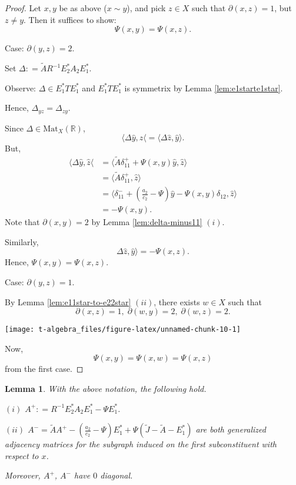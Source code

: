 \documentclass[
]{book}
\newtheorem{lemma}{Lemma}[chapter]
\theoremstyle{definition}
\theoremstyle{definition}
\theoremstyle{definition}
\theoremstyle{definition}
\theoremstyle{remark}
\begin{document}
\begin{proof}
Let \(x,y\) be as above (\(x\sim y\)), and pick \(z\in X\) such that \(\partial(x,z) = 1\), but \(z\neq y\). Then it suffices to show:
\[\Psi(x,y) = \Psi(x,z).\]

Case: \(\partial(y,z) = 2\).

Set \(\Delta: = \tilde{A}R^{-1}E^*_2A_2E^*_1\).

Observe: \(\Delta \in E^*_1TE^*_1\) and \(E^*_1TE^*_1\) is symmetrix by Lemma \ref{lem:e1starte1star}.

Hence, \(\Delta_{yz} = \Delta_{zy}\).

Since \(\Delta\in \mathrm{Mat}_X(\mathbb{R})\),
\[\langle \Delta\hat{y}, \hat{z}\langle = \langle \Delta \hat{z}, \hat{y}\rangle.\]
But,
\begin{align}
\langle \Delta\hat{y}, \hat{z}\langle & = \langle \tilde{A}\delta^+_{11} + \Psi(x,y)\hat{y}, \hat{z}\rangle \\
& = \langle \tilde{A}\delta^+_{11}, \hat{z}\rangle\\
& = \langle \delta^-_{11} + \left(\frac{a_2}{c_2}-\Psi\right)\hat{y} - \Psi(x,y)\delta_{12}, \hat{z}\rangle\\
& = -\Psi(x,y).
\end{align}
Note that \(\partial(x,y) = 2\) by Lemma \ref{lem:delta-minus11} \((i)\).

Similarly,
\[\Delta\hat{z}, \hat{y}\rangle = -\Psi(x,z).\]
Hence, \(\Psi(x,y) = \Psi(x,z)\).

Case: \(\partial(y,z) = 1\).

By Lemma \ref{lem:e11star-to-e22star} \((ii)\), there exists \(w\in X\) such that
\[\partial(x,z) = 1, \; \partial(w,y)=2, \; \partial(w,z)=2.\]

\begin{center}\texttt{[image: t-algebra\_files/figure-latex/unnamed-chunk-10-1]} \end{center}

Now,
\[\Psi(x,y) = \Psi(x,w) = \Psi(x,z)\]
from the first case.
\end{proof}

\begin{lemma}
\protect\hypertarget{lem:aplus-aminus}{}\label{lem:aplus-aminus}With the above notation, the following hold.

\((i)\) \(A^+: = R^{-1}E^*_2A_2E^*_1 - \Psi E^*_1\).

\((ii)\) \(A^- = \tilde{A}A^+ - \left(\frac{a_2}{c_2}-\Psi\right)E^*_1 + \Psi(\tilde{J} - \tilde{A} - E^*_1)\) are both generalized adjacency matrices for the subgraph induced on the first subconstituent with respect to \(x\).

Moreover, \(A^+\), \(A^-\) have \(0\) diagonal.
\end{lemma}
\end{document}
